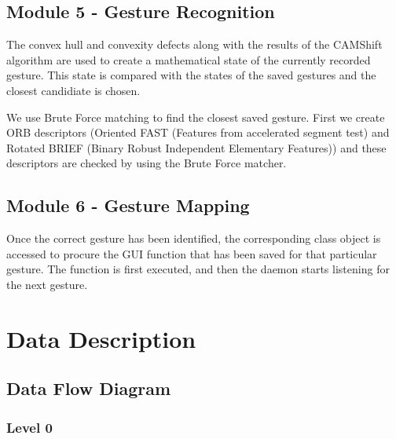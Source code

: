 \documentclass{scrreprt}
\begin{document}
\section{Module 5 - Gesture Recognition}
The convex hull and convexity defects along with the results of the CAMShift algorithm are 
used to create a mathematical state of the currently recorded gesture. This state is compared 
with the states of the saved gestures and the closest candidiate is chosen.

We use Brute Force matching to find the closest saved gesture. First we create 
ORB descriptors (Oriented FAST (Features from accelerated segment test) and Rotated BRIEF 
(Binary Robust Independent Elementary Features)) and these descriptors are checked by using the 
Brute Force matcher.  

\section{Module 6 - Gesture Mapping}

Once the correct gesture has been identified, 
the corresponding class object is accessed to procure the GUI function that has been saved 
for that particular gesture. The function is first executed, and then the daemon starts listening 
for the next gesture.

\chapter{Data Description}

\section{Data Flow Diagram}

\subsection{Level 0}
\\
\end{document}
